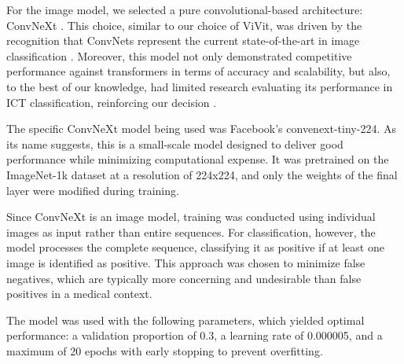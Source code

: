 For the image model, we selected a pure convolutional-based architecture: ConvNeXt \cite{convnextbro}. This choice, similar to our choice of ViVit, was driven by the recognition that ConvNets represent the current state-of-the-art in image classification \cite{convnextbro}. Moreover, this model not only demonstrated competitive performance against transformers in terms of accuracy and scalability, but also, to the best of our knowledge, had limited research evaluating its performance in ICT classification, reinforcing our decision \cite{convnextbro}.

The specific ConvNeXt model being used was Facebook’s convenext-tiny-224. As its name suggests, this is a small-scale model designed to deliver good performance while minimizing computational expense. It was pretrained on the ImageNet-1k dataset at a resolution of 224x224, and only the weights of the final layer were modified during training.

Since ConvNeXt is an image model, training was conducted using individual images as input rather than entire sequences. For classification, however, the model processes the complete sequence, classifying it as positive if at least one image is identified as positive. This approach was chosen to minimize false negatives, which are typically more concerning and undesirable than false positives in a medical context.

The model was used with the following parameters, which yielded optimal performance: a validation proportion of 0.3, a learning rate of 0.000005, and a maximum of 20 epochs with early stopping to prevent overfitting.